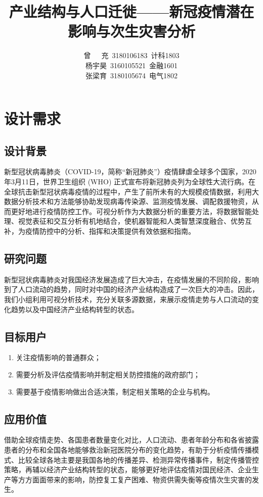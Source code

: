 \documentclass{ctexart}
\title{产业结构与人口迁徙——新冠疫情潜在影响与次生灾害分析}
\author{曾\ \ \ 充\ 3180106183\ 计科1803 \\ 杨宇昊\ 3160105521\ 金融1601 \\ 张梁育\ 3180105674\ 电气1802}
\begin{document}
\begin{titlepage}
    \maketitle
\end{titlepage}
\tableofcontents
\newpage
\section{设计需求}

\subsection{设计背景}
新型冠状病毒肺炎（COVID-19，简称“新冠肺炎”）疫情肆虐全球多个国家，2020年3月11日，世界卫生组织 (WHO) 正式宣布将新冠肺炎列为全球性大流行病。在全球抗击新型冠状病毒疫情的过程中，产生了前所未有的大规模疫情数据，利用大数据分析技术和方法能够协助发现病毒传染源、监测疫情发展、调配救援物资，从而更好地进行疫情防控工作。可视分析作为大数据分析的重要方法，将数据智能处理、视觉表征和交互分析有机地结合，使机器智能和人类智慧深度融合、优势互补，为疫情防控中的分析、指挥和决策提供有效依据和指南。
\subsection{研究问题}
新型冠状病毒肺炎对我国经济发展造成了巨大冲击，在疫情发展的不同阶段，影响到了人口流动的趋势，同时对中国的经济产业结构造成了一次巨大的冲击。因此，我们小组利用可视分析技术，充分关联多源数据，来展示疫情走势与人口流动的变化趋势以及中国经济产业结构转型的状态。
\subsection{目标用户}
\begin{enumerate}
    \item 关注疫情影响的普通群众；
    \item 需要分析及评估疫情影响并制定相关防控措施的政府部门；
    \item 需要基于疫情影响做出合适决策，制定相关策略的企业与机构。
\end{enumerate}
\subsection{应用价值}
借助全球疫情走势、各国患者数量变化对比，人口流动、患者年龄分布和各省披露患者的分布和全国各地能够救治新冠医院分布的变化趋势，有助于分析疫情传播模式、比较全球各地主要是我国各地的传播差异、检测异常传播事件，制定传播管控策略，再辅以经济产业结构转型的状态，能够更好地评估疫情对国民经济、企业生产等方方面面带来的影响，防控复工复产困难、物资供需失衡等疫情次生灾害的发生。
\end{document}
